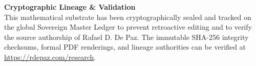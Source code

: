\documentclass[12pt, a4paper]{article}
\theoremstyle{plain}
\theoremstyle{definition}
\theoremstyle{remark}
\begin{document}
\vspace{2em}
\noindent\hrulefill
\vspace{1em}

\noindent\textbf{Cryptographic Lineage \& Validation}\\
This mathematical substrate has been cryptographically sealed and tracked on the global Sovereign Master Ledger to prevent retroactive editing and to verify the source authorship of Rafael D. De Paz. The immutable SHA-256 integrity checksums, formal PDF renderings, and lineage authorities can be verified at \url{https://rdepaz.com/research}.



\end{document}
